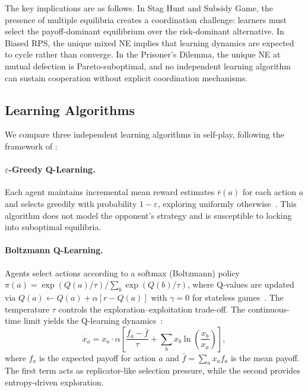 \documentclass[11pt,a4paper]{article}
\begin{document}
The key implications are as follows. In Stag Hunt and Subsidy Game, the presence of multiple equilibria creates a coordination challenge: learners must select the payoff-dominant equilibrium over the risk-dominant alternative. In Biased RPS, the unique mixed NE implies that learning dynamics are expected to cycle rather than converge. In the Prisoner's Dilemma, the unique NE at mutual defection is Pareto-suboptimal, and no independent learning algorithm can sustain cooperation without explicit coordination mechanisms.

\subsection{Learning Algorithms}
\label{sec:algorithms}

We compare three independent learning algorithms in self-play, following the framework of \citet{bloembergen2015}:

\paragraph{$\varepsilon$-Greedy Q-Learning.}
Each agent maintains incremental mean reward estimates $\bar{r}(a)$ for each action $a$ and selects greedily with probability $1-\varepsilon$, exploring uniformly otherwise~\citep{sutton2018}. This algorithm does not model the opponent's strategy and is susceptible to locking into suboptimal equilibria.

\paragraph{Boltzmann Q-Learning.}
Agents select actions according to a softmax (Boltzmann) policy $\pi(a) = \exp(Q(a)/\tau) / \sum_b \exp(Q(b)/\tau)$, where Q-values are updated via $Q(a) \leftarrow Q(a) + \alpha[r - Q(a)]$ with $\gamma = 0$ for stateless games~\citep{watkins1992}. The temperature $\tau$ controls the exploration--exploitation trade-off. The continuous-time limit yields the Q-learning dynamics~\citep{bloembergen2015}:
\begin{equation}
\label{eq:ql_dynamics}
\dot{x}_a = x_a \cdot \alpha \left[ \frac{f_a - \bar{f}}{\tau} + \sum_{b} x_b \ln\!\left(\frac{x_b}{x_a}\right) \right],
\end{equation}
where $f_a$ is the expected payoff for action $a$ and $\bar{f} = \sum_a x_a f_a$ is the mean payoff. The first term acts as replicator-like selection pressure, while the second provides entropy-driven exploration.
\end{document}
